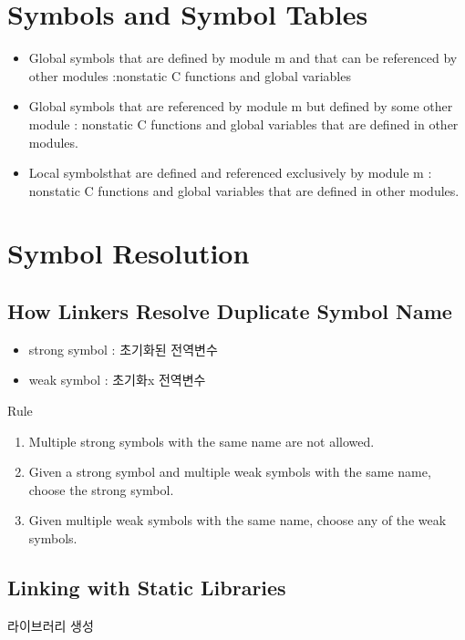 \section{Symbols and Symbol Tables}


\begin{itemize}
    \item Global symbols that are defined by module m and that can be referenced by other modules :nonstatic C functions and
    global variables
    \item Global symbols that are referenced by module m but defined by some other module : nonstatic C functions and global variables that are defined in other modules.
    \item Local symbolsthat are defined and referenced exclusively by module m : nonstatic C functions and global variables that are defined in other modules.
\end{itemize}

\section{Symbol Resolution}

\subsection{How Linkers Resolve Duplicate Symbol Name}

\begin{itemize}
    \item strong symbol : 초기화된 전역변수
    \item weak symbol : 초기화x 전역변수
\end{itemize}

Rule
\begin{enumerate}
    \item Multiple strong symbols with the same name are not allowed.
    \item Given a strong symbol and multiple weak symbols with the same name, choose the strong symbol.
    \item Given multiple weak symbols with the same name, choose any of the weak symbols.
\end{enumerate}

\subsection{Linking with Static Libraries}

라이브러리 생성

